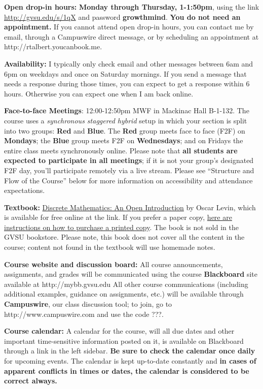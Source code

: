 \documentclass[]{article}
\begin{document}
\textbf{Open drop-in hours:} \textbf{Monday through Thursday, 1-1:50pm},
using the link \url{http://gvsu.edu/s/1qX} and password
\textbf{growthmind}. \textbf{You do not need an appointment.} If you
cannot attend open drop-in hours, you can contact me by email, through a
Campuswire direct message, or by scheduling an appointment at
http://rtalbert.youcanbook.me.

\textbf{Availability:} I typically only check email and other messages
between 6am and 6pm on weekdays and once on Saturday mornings. If you
send a message that needs a response during those times, you can expect
to get a response within 6 hours. Otherwise you can expect one when I am
back online.

\textbf{Face-to-face Meetings}: 12:00-12:50pm MWF in Mackinac Hall
B-1-132. The course uses a \emph{synchronous staggered hybrid} setup in
which your section is split into two groups: \textbf{Red} and
\textbf{Blue}. The \textbf{Red} group meets face to face (F2F) on
\textbf{Mondays}; the \textbf{Blue} group meets F2F on
\textbf{Wednesdays}; and on Fridays the entire class meets synchronously
online. Please note that \textbf{all students are expected to
participate in all meetings}; if it is not your group's designated F2F
day, you'll participate remotely via a live stream. Please see
``Structure and Flow of the Course'' below for more information on
accessibility and attendance expectations.

\textbf{Textbook:}
\href{http://discretetext.oscarlevin.com/dmoi/}{Discrete Mathematics: An
Open Introduction} by Oscar Levin, which is available for free online at
the link. If you prefer a paper copy,
\href{http://discretetext.oscarlevin.com/download.php}{here are
instructions on how to purchase a printed copy}. The book is not sold in
the GVSU bookstore. Please note, this book does not cover all the
content in the course; content not found in the textbook will use
homemade notes.

\textbf{Course website and discussion board:} All course announcements,
assignments, and grades will be communicated using the course
\textbf{Blackboard} site available at http://mybb.gvsu.edu All other
course communications (including additional examples, guidance on
assignments, etc.) will be available through \textbf{Campuswire}, our
class discussion tool; to join, go to http://www.campuswire.com and use
the code ???.

\textbf{Course calendar:} A calendar for the course, will all due dates
and other important time-sensitive information posted on it, is
available on Blackboard through a link in the left sidebar. \textbf{Be
sure to check the calendar once daily} for upcoming events. The calendar
is kept up-to-date constantly and \textbf{in cases of apparent conflicts
in times or dates, the calendar is considered to be correct always.}
\end{document}
